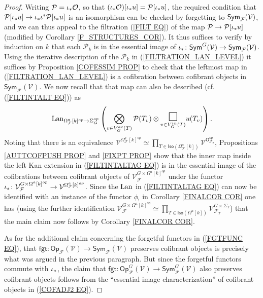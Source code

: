 \documentclass[a4paper,10pt]{article}%
\begin{document}
\begin{proof}
Writing $\mathcal{P} = \iota_{\**} \mathcal{O}$, so that 
$(\iota_{\**} \mathcal{O})[\iota_{\**} u] = \mathcal{P}[\iota_{\**} u]$,
the required condition that
$\mathcal{P}[\iota_{\**} u] \to \iota_{\**} \iota^{\**}\mathcal{P}[\iota_{\**} u]$
is an isomorphism can be checked by forgetting to 
$\mathsf{Sym}_{\mathcal F}(\mathcal{V})$, and we can thus appeal to the filtration 
(\ref{FILT EQ}) of the map
$ \mathcal{P} \to \mathcal{P}[\iota_{\**} u]$ (modified by Corollary \ref{F_STRUCTURES_COR}). It thus suffices to verify by induction on $k$ that each 
$\mathcal{P}_k$ is in the essential image of 
$\iota_{\**} \colon \mathsf{Sym}^G(\mathcal{V})
\to \mathsf{Sym}_{\mathcal{F}}(\mathcal{V})$.
Using the iterative description 
of the $\mathcal{P}_k$ in
(\ref{FILTRATION_LAN_LEVEL})
it suffices by
Proposition \ref{COFESSIM PROP}
to check that the leftmost map in (\ref{FILTRATION_LAN_LEVEL}) is
a cofibration between cofibrant objects in 
$\mathsf{Sym}_{\mathcal{F}}(\mathcal{V})$.
We now recall that that map can also be described 
(cf. (\ref{FILTINTALT EQ})) as
\begin{equation}\label{FILTINTALTAG EQ}
	\Lan_{\Omega_{\mathcal{F}}^a[k]^{op} \to \Sigma_G^{op}}
	\left(
		\bigotimes\limits_{v \in V_{G}^{ac}(T)}\P(T_v) \otimes
		\underset{v \in V_{G}^{in}(T)}
		{\mathlarger{\mathlarger{\mathlarger{\square}}}}
		u(T_v)
	\right).
\end{equation}
Noting that there is an equivalence
$\mathcal{V}^{\Omega_{\mathcal{F}}^a[k]^{op}} \simeq
\prod_{T \in \mathsf{Iso}(\Omega_{\mathcal{F}}^a[k])}
\mathcal{V}^{\mathsf{O}^{op}_{\mathcal{F}_T}}$,
Propositions \ref{AUTTCOFPUSH PROP}
and \ref{FIXPT PROP} show that the 
inner map inside the left Kan extension in (\ref{FILTINTALTAG EQ})
is in the essential image
of the cofibrations between cofibrant objects of
$\mathcal{V}^{G \times \Omega^a[k]^{op}}_{\mathcal{F}}$
under the functor
$\iota_{\**} \colon
\mathcal{V}^{G \times \Omega^a[k]^{op}}_{\mathcal{F}}
\to
\mathcal{V}^{\Omega^a_{\mathcal{F}}[k]^{op}}$.
Since the $\operatorname{Lan}$ in (\ref{FILTINTALTAG EQ})
can now be identified with an instance of the functor $\phi_!$ 
in Corollary \ref{FINALCOR COR} one has 
(using the further identification
$\mathcal{V}^{G \times \Omega^a[k]^{op}}_{\mathcal{F}} \simeq
\prod_{T \in \mathsf{Iso}(\Omega^a[k])}
\mathcal{V}^{G \times \Sigma_T}_{\mathcal{F}_T}$)
that the main claim now follows by Corollary \ref{FINALCOR COR}.

As for the additional claim concerning the forgetful functors
in (\ref{FGTFUNC EQ}),
that $\mathsf{fgt} \colon
\mathsf{Op}_{\mathcal{F}}(\mathcal{V})
\to \mathsf{Sym}_{\mathcal{F}}(\mathcal{V})$
preserves cofibrant objects is precisely what was argued in the previous paragraph.
But since the forgetful functors commute with $\iota_{\**}$, the claim that
$\mathsf{fgt} \colon
\mathsf{Op}^G_{\mathcal{F}}(\mathcal{V})
\to \mathsf{Sym}^G_{\mathcal{F}}(\mathcal{V})$
also preserves cofibrant objects follows from the
``essential image characterization'' of cofibrant objects in
(\ref{COFADJ2 EQ}).
\end{proof}
\end{document}
